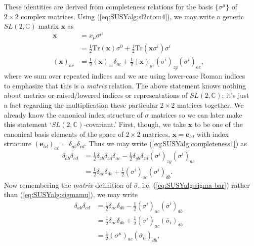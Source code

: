 \documentclass[12pt, oneside]{report}    %
\begin{document}
These identities are derived from completeness relations for the basis $\{\sigma^\mu\}$ of $2\times 2$ complex matrices. Using  (\ref{eq:SUSYalg:sl2ctom4}), we may write a generic $SL(2,\mathbb C)$ matrix $\mathbf x$ as 
\begin{align}
    \mathbf{x} &= x_\mu\sigma^\mu\\
                &= \frac 12\text{Tr}(\mathbf x) \sigma^0 + \frac 12\text{Tr}(\mathbf x\sigma^i)\sigma^i\\
    (\mathbf{x})_{ac} &= \frac 12 (\mathbf x)_{zz}\delta_{ac} + \frac 12 
(\mathbf x)_{yz}(\sigma^i)_{zy}(\sigma^i)_{ac},\label{eq:SUSYalg:completeness1}
\end{align}
where we sum over repeated indices and we are using lower-case Roman indices to emphasize that this is a \textit{matrix} relation. The above statement knows nothing about metrics or raised/lowered indices or representations of $SL(2,\mathbb C)$; it's just a fact regarding the multiplication these particular $2\times 2$ matrices together. We already know the canonical index structure of $\sigma$ matrices so we can later make this statement `$SL(2,\mathbb C)$-covariant.' First, though, we take $\mathbf x$ to be one of the canonical basis elements of the space of $2\times 2$ matrices, $\mathbf x = \mathbf e_{bd}$ with index structure $(\mathbf e_{bd})_{ac} = \delta_{ab}\delta_{cd}$. Thus we may write  (\ref{eq:SUSYalg:completeness1}) as
\begin{align}
    \delta_{ab}\delta_{cd} &= \frac 12 \delta_{zb}\delta_{zd}\delta_{ac} - \frac 12 \delta_{yb}\delta_{zd}(\sigma^i)_{zy}(\sigma^i)_{ac}\\
        &= \frac 12 \delta_{ac}\delta_{db} + \frac 12 (\sigma^i)_{ac}(\sigma^i)_{db}.\label{eq:SUSYalg:sigma:completeness}
\end{align}
Now remembering the \textit{matrix} definition of $\overline\sigma$, i.e.  (\ref{eq:SUSYalg:sigma-bar}) rather than (\ref{eq:SUSYalg:sigmamu}), we may write
\begin{align}
    \delta_{ab}\delta_{cd} &= \frac 12 \delta_{ac}\delta_{db} - \frac 12 (\sigma^i)_{ac}(\overline\sigma^i)_{db}\\
    &= \frac 12 \delta_{ac}\delta_{db} + \frac 12 (\sigma^i)_{ac}(\overline\sigma_i)_{db}\\
    &= \frac 12 (\sigma^\mu)_{ac}(\overline\sigma_\mu)_{db},
\end{align}
\end{document}
